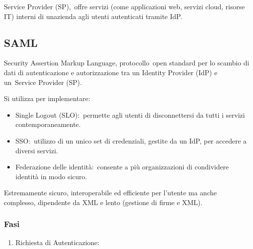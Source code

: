 \documentclass[
]{article}
\providecommand{\tightlist}{%
  \setlength{\itemsep}{0pt}\setlength{\parskip}{0pt}}
\begin{document}
{}

{}

{Service Provider (SP)}{,}{~offre servizi (come applicazioni web,
servizi cloud, risorse IT) interni di un\textquotesingle azienda agli
utenti autenticati tramite }{IdP}{.}

\subsection{\texorpdfstring{{SAML}}{SAML}}\label{h.nc8k8o5m0nwj}

{Security Assertion Markup Language}{, }{protocollo}{~open standard per
lo scambio di dati di autenticazione e autorizzazione tra un }{Identity
Provider (IdP}{) e un}{~Service Provider (SP)}{.}

{}

{Si utilizza per implementare: }

\begin{itemize}
\tightlist
\item
  {Single Logout (SLO):}{~permette agli utenti di disconnettersi da
  tutti i servizi contemporaneamente.}
\end{itemize}

{}

\begin{itemize}
\tightlist
\item
  {SSO:}{~utilizzo di un unico set di credenziali, gestite da un IdP,
  per accedere a diversi servizi.}
\end{itemize}

{}

\begin{itemize}
\tightlist
\item
  {Federazione delle identità:}{~consente a più organizzazioni di
  condividere identità in modo sicuro.}
\end{itemize}

{}

{Estremamente }{sicuro}{, }{interoperabile }{ed }{efficiente }{per
l'utente }{ma }{anche }{complesso}{, }{dipendente da XML }{e }{lento
}{(gestione di firme e XML).}

\subsubsection{\texorpdfstring{{Fasi}}{Fasi}}\label{h.fbrboy32d53l}

\begin{enumerate}
\tightlist
\item
  {Richiesta di Autenticazione}{: }
\end{enumerate}
\end{document}
